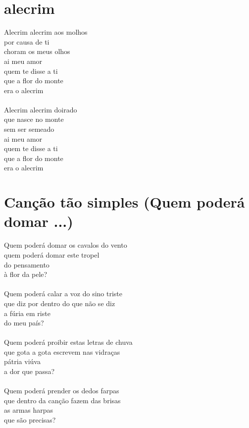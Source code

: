 \documentclass{article}
\begin{document}
\section{ alecrim}
Alecrim alecrim aos molhos\\
por causa de ti\\
choram os meus olhos\\
ai meu amor\\
quem te disse a ti\\
que a flor do monte\\
era o alecrim\\
\\
Alecrim alecrim doirado\\
que nasce no monte \\
sem ser semeado\\
ai meu amor\\
quem te disse a ti\\
que a flor do monte\\
era o alecrim\\
\section{ Canção tão simples (Quem poderá domar ...)}
Quem poderá domar os cavalos do vento\\
quem poderá domar este tropel\\
do pensamento\\
à flor da pele?\\
\\
Quem poderá calar a voz do sino triste\\
que diz por dentro do que não se diz\\
a fúria em riste\\
do meu país?\\
\\
Quem poderá proibir estas letras de chuva\\
que gota a gota escrevem nas vidraças\\
pátria viúva\\
a dor que passa?\\
\\
Quem poderá prender os dedos farpas\\
que dentro da canção fazem das brisas\\
as armas harpas\\
que são precisas?\\
\end{document}
